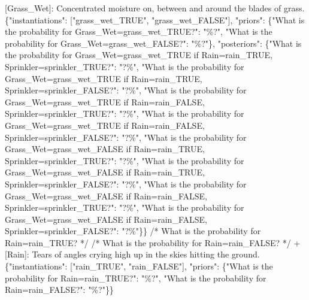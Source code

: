 \documentclass[
  11pt,
  letterpaper,
]{book}
\newenvironment{Shaded}{\begin{snugshade}}{\end{snugshade}}
\newcommand{\DataTypeTok}[1]{\textcolor[rgb]{0.68,0.00,0.00}{#1}}
\newcommand{\ErrorTok}[1]{\textcolor[rgb]{0.68,0.00,0.00}{#1}}
\newcommand{\FunctionTok}[1]{\textcolor[rgb]{0.28,0.35,0.67}{#1}}
\newcommand{\OtherTok}[1]{\textcolor[rgb]{0.00,0.23,0.31}{#1}}
\newcommand{\StringTok}[1]{\textcolor[rgb]{0.13,0.47,0.30}{#1}}
\begin{document}
\begin{landscape}
\begin{Shaded}
\begin{Highlighting}[]
    \OtherTok{[}\ErrorTok{Grass\_Wet}\OtherTok{]}\ErrorTok{:} \ErrorTok{Concentrated} \ErrorTok{moisture} \ErrorTok{on,} \ErrorTok{between} \ErrorTok{and} \ErrorTok{around} \ErrorTok{the} \ErrorTok{blades} \ErrorTok{of} \ErrorTok{grass.} \FunctionTok{\{}\DataTypeTok{"instantiations"}\FunctionTok{:} \OtherTok{[}\StringTok{"grass\_wet\_TRUE"}\OtherTok{,} \StringTok{"grass\_wet\_FALSE"}\OtherTok{]}\FunctionTok{,} \DataTypeTok{"priors"}\FunctionTok{:} \FunctionTok{\{}\DataTypeTok{"What is the probability for Grass\_Wet=grass\_wet\_TRUE?"}\FunctionTok{:} \StringTok{"\%?"}\FunctionTok{,} \DataTypeTok{"What is the probability for Grass\_Wet=grass\_wet\_FALSE?"}\FunctionTok{:} \StringTok{"\%?"}\FunctionTok{\},} \DataTypeTok{"posteriors"}\FunctionTok{:} \FunctionTok{\{}\DataTypeTok{"What is the probability for Grass\_Wet=grass\_wet\_TRUE if Rain=rain\_TRUE, Sprinkler=sprinkler\_TRUE?"}\FunctionTok{:} \StringTok{"?\%"}\FunctionTok{,} \DataTypeTok{"What is the probability for Grass\_Wet=grass\_wet\_TRUE if Rain=rain\_TRUE, Sprinkler=sprinkler\_FALSE?"}\FunctionTok{:} \StringTok{"?\%"}\FunctionTok{,} \DataTypeTok{"What is the probability for Grass\_Wet=grass\_wet\_TRUE if Rain=rain\_FALSE, Sprinkler=sprinkler\_TRUE?"}\FunctionTok{:} \StringTok{"?\%"}\FunctionTok{,} \DataTypeTok{"What is the probability for Grass\_Wet=grass\_wet\_TRUE if Rain=rain\_FALSE, Sprinkler=sprinkler\_FALSE?"}\FunctionTok{:} \StringTok{"?\%"}\FunctionTok{,} \DataTypeTok{"What is the probability for Grass\_Wet=grass\_wet\_FALSE if Rain=rain\_TRUE, Sprinkler=sprinkler\_TRUE?"}\FunctionTok{:} \StringTok{"?\%"}\FunctionTok{,} \DataTypeTok{"What is the probability for Grass\_Wet=grass\_wet\_FALSE if Rain=rain\_TRUE, Sprinkler=sprinkler\_FALSE?"}\FunctionTok{:} \StringTok{"?\%"}\FunctionTok{,} \DataTypeTok{"What is the probability for Grass\_Wet=grass\_wet\_FALSE if Rain=rain\_FALSE, Sprinkler=sprinkler\_TRUE?"}\FunctionTok{:} \StringTok{"?\%"}\FunctionTok{,} \DataTypeTok{"What is the probability for Grass\_Wet=grass\_wet\_FALSE if Rain=rain\_FALSE, Sprinkler=sprinkler\_FALSE?"}\FunctionTok{:} \StringTok{"?\%"}\FunctionTok{\}\}}
        \ErrorTok{/*} \ErrorTok{What} \ErrorTok{is} \ErrorTok{the} \ErrorTok{probability} \ErrorTok{for} \ErrorTok{Rain=rain\_TRUE?} \ErrorTok{*/}
        \ErrorTok{/*} \ErrorTok{What} \ErrorTok{is} \ErrorTok{the} \ErrorTok{probability} \ErrorTok{for} \ErrorTok{Rain=rain\_FALSE?} \ErrorTok{*/}
        \ErrorTok{+} \OtherTok{[}\ErrorTok{Rain}\OtherTok{]}\ErrorTok{:} \ErrorTok{Tears} \ErrorTok{of} \ErrorTok{angles} \ErrorTok{crying} \ErrorTok{high} \ErrorTok{up} \ErrorTok{in} \ErrorTok{the} \ErrorTok{skies} \ErrorTok{hitting} \ErrorTok{the} \ErrorTok{ground.} \FunctionTok{\{}\DataTypeTok{"instantiations"}\FunctionTok{:} \OtherTok{[}\StringTok{"rain\_TRUE"}\OtherTok{,} \StringTok{"rain\_FALSE"}\OtherTok{]}\FunctionTok{,} \DataTypeTok{"priors"}\FunctionTok{:} \FunctionTok{\{}\DataTypeTok{"What is the probability for Rain=rain\_TRUE?"}\FunctionTok{:} \StringTok{"\%?"}\FunctionTok{,} \DataTypeTok{"What is the probability for Rain=rain\_FALSE?"}\FunctionTok{:} \StringTok{"\%?"}\FunctionTok{\}\}}

\end{Highlighting}
\end{Shaded}
\end{landscape}
\end{document}
